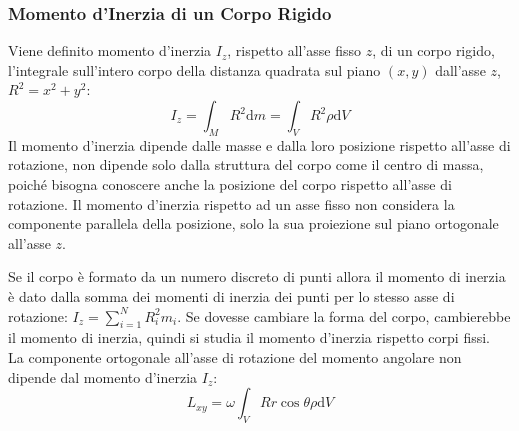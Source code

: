 \documentclass{article}
\newcommand{\df}{\mathrm{d}}
\numberwithin{equation}{subsection}
\begin{document}
\subsubsection{Momento d'Inerzia di un Corpo Rigido}

Viene definito momento d'inerzia $I_z$, rispetto all'asse fisso $z$, di un corpo rigido, l'integrale sull'intero corpo della distanza quadrata sul piano $(x,y)$ dall'asse $z$, 
$R^2=x^2+y^2$:  
\begin{equation}
    I_z=\displaystyle\int_M R^2\df m=\int_V R^2\rho \df V
\end{equation}
Il momento d'inerzia dipende dalle masse e dalla loro posizione rispetto all'asse di rotazione, non dipende solo dalla struttura del corpo come il centro di massa, poiché 
bisogna conoscere anche la posizione del corpo rispetto all'asse di rotazione. Il momento d'inerzia rispetto ad un asse fisso non considera la componente parallela della 
posizione, solo la sua proiezione sul piano ortogonale all'asse $z$.  




Se il corpo è formato da un numero discreto di punti allora 
il momento di inerzia è dato dalla somma dei momenti di inerzia dei punti per lo stesso asse di rotazione: $I_z=\sum_{i=1}^{N}R_i^2m_i$. 
Se dovesse cambiare la forma del corpo, cambierebbe 
il momento di inerzia, quindi si studia il momento d'inerzia 
rispetto corpi fissi. 
\\
La componente ortogonale all'asse di rotazione del momento angolare non dipende dal momento d'inerzia $I_z$:
\begin{equation*}
    L_{xy}=\omega\int_V Rr\cos\theta \rho \df V
\end{equation*}
\end{document}
